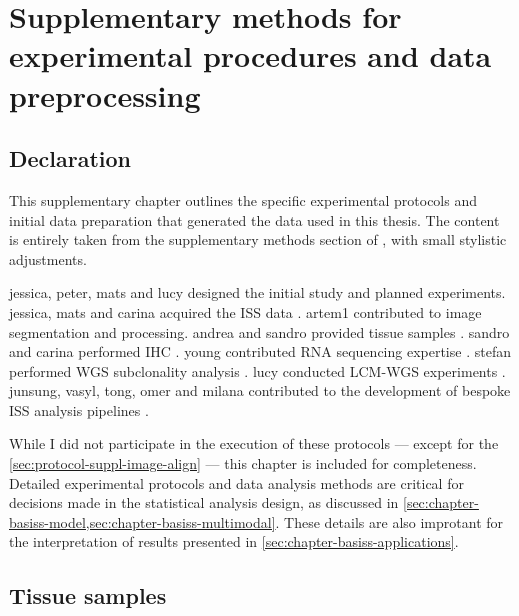 \chapter{Supplementary methods for experimental procedures and data preprocessing}
\label{sec:supplement-chapter-method}
\section*{Declaration}

This supplementary chapter outlines the specific experimental protocols and initial data preparation that generated the data used in this thesis. The content is entirely taken from the supplementary methods section of \textcite{Lomakin2022-ks}, with small stylistic adjustments.

\ac{jessica}, \ac{peter}, \ac{mats} and \ac{lucy} designed the initial study and planned experiments. \ac{jessica}, \ac{mats} and \ac{carina} acquired the \ac{ISS} data . \ac{artem1} contributed to image segmentation and processing. \ac{andrea} and \ac{sandro} provided tissue samples . \ac{sandro} and \ac{carina} performed \ac{IHC} . \ac{young} contributed RNA sequencing expertise . \ac{stefan} performed \ac{WGS} subclonality analysis . \ac{lucy} conducted \ac{LCM}-\ac{WGS} experiments . \ac{junsung}, \ac{vasyl}, \ac{tong}, \ac{omer} and \ac{milana} contributed to the development of bespoke \ac{ISS} analysis pipelines .

While I did not participate in the execution of these protocols — except for the \cref{sec:protocol-suppl-image-align} — this chapter is included for completeness. Detailed experimental protocols and data analysis methods are critical for decisions made in the statistical analysis design, as discussed in \cref{sec:chapter-basiss-model,sec:chapter-basiss-multimodal}. These details are also improtant for the interpretation of results presented in \cref{sec:chapter-basiss-applications}.

\section{Tissue samples}
\label{sec:protocol-suppl-tissues}

